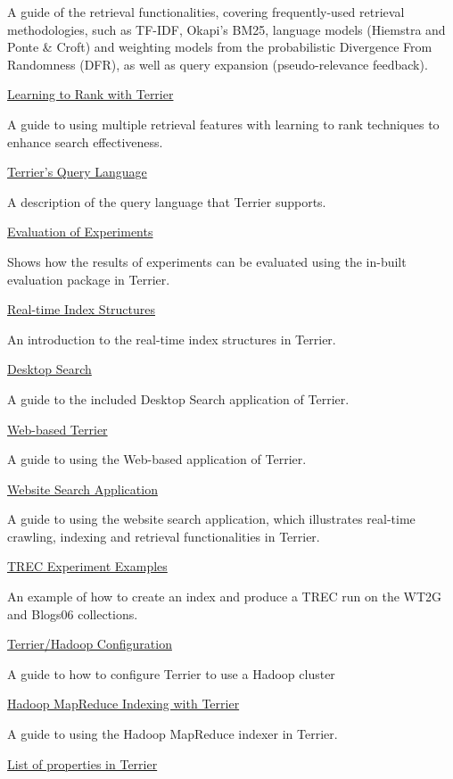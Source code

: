 A guide of the retrieval functionalities, covering frequently-used
retrieval methodologies, such as TF-IDF, Okapi's BM25, language models
(Hiemstra and Ponte \& Croft) and weighting models from the
probabilistic Divergence From Randomness (DFR), as well as query
expansion (pseudo-relevance feedback).

\href{learning.html}{Learning to Rank with Terrier}

A guide to using multiple retrieval features with learning to rank
techniques to enhance search effectiveness.

\href{querylanguage.html}{Terrier's Query Language}

A description of the query language that Terrier supports.

\href{evaluation.html}{Evaluation of Experiments}

Shows how the results of experiments can be evaluated using the in-built
evaluation package in Terrier.

\href{realtime_indices.html}{Real-time Index Structures}

An introduction to the real-time index structures in Terrier.

\href{terrier_desktop.html}{Desktop Search}

A guide to the included Desktop Search application of Terrier.

\href{terrier_http.html}{Web-based Terrier}

A guide to using the Web-based application of Terrier.

\href{website_search.html}{Website Search Application}

A guide to using the website search application, which illustrates
real-time crawling, indexing and retrieval functionalities in Terrier.

\href{trec_examples.html}{TREC Experiment Examples}

An example of how to create an index and produce a TREC run on the WT2G
and Blogs06 collections.

\href{hadoop_configuration.html}{Terrier/Hadoop Configuration}

A guide to how to configure Terrier to use a Hadoop cluster

\href{hadoop_indexing.html}{Hadoop MapReduce Indexing with Terrier}

A guide to using the Hadoop MapReduce indexer in Terrier.

\href{properties.html}{List of properties in Terrier}

